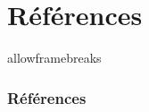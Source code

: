 \documentclass[xetex, compress, table, svgnames]{beamer}
\begin{document}


\section*{Références}

\begin{frame}{allowframebreaks}
  \frametitle{Références}
  \small{%
    
    
}
\end{frame}
\end{document}
